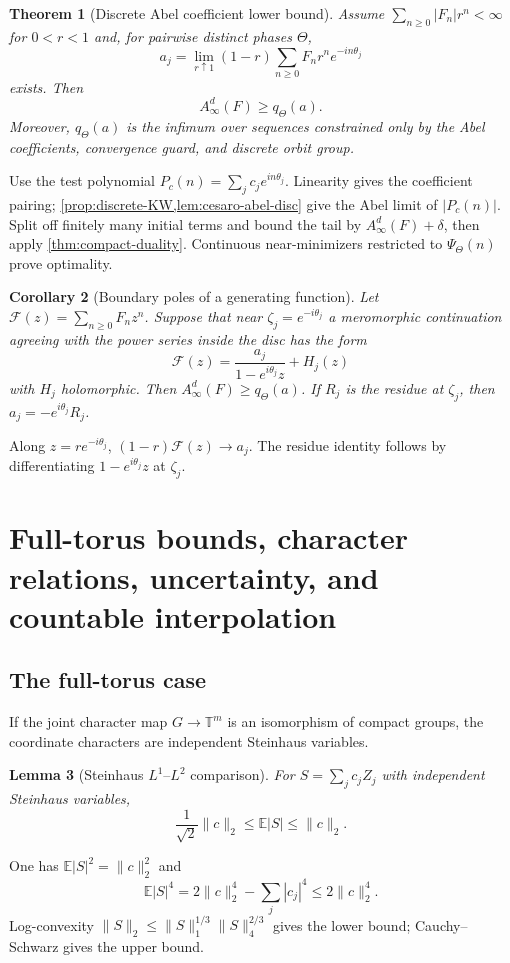 \documentclass[12pt,a4paper,twoside]{extarticle}
\makeatletter
\theoremstyle{compactplain}
\newtheorem{theorem}{Theorem}[section]
\newtheorem{lemma}[theorem]{Lemma}
\newtheorem{corollary}[theorem]{Corollary}
\theoremstyle{compactdef}
\renewenvironment{proof}[1][\proofname]{\par\pushQED{\qed}\normalfont
  \topsep2pt\trivlist\item[\hskip\labelsep\bfseries #1\@addpunct{.}]\ignorespaces}
 {\popQED\endtrivlist\@endpefalse}
\makeatother
\begin{document}
\begin{theorem}[Discrete Abel coefficient lower bound]\label{thm:discrete-abel}
Assume $\sum_{n\ge0}|F_n|r^n<\infty$ for $0<r<1$ and, for pairwise distinct phases $\Theta$,
\[
 a_j=\lim_{r\uparrow1}(1-r)\sum_{n\ge0}F_nr^ne^{-in\theta_j}
\]
exists.  Then
\[
 A_\infty^d(F)\ge q_\Theta(a).
\]
Moreover, $q_\Theta(a)$ is the infimum over sequences constrained only by the Abel coefficients, convergence guard, and discrete orbit group.
\end{theorem}
\begin{proof}
Use the test polynomial $P_c(n)=\sum_jc_je^{in\theta_j}$.  Linearity gives the coefficient pairing; \cref{prop:discrete-KW,lem:cesaro-abel-disc} give the Abel limit of $|P_c(n)|$.  Split off finitely many initial terms and bound the tail by $A_\infty^d(F)+\delta$, then apply \cref{thm:compact-duality}.  Continuous near-minimizers restricted to $\Psi_\Theta(n)$ prove optimality.
\end{proof}

\begin{corollary}[Boundary poles of a generating function]\label{cor:gf-poles}
Let $\mathcal F(z)=\sum_{n\ge0}F_nz^n$.  Suppose that near $\zeta_j=e^{-i\theta_j}$ a meromorphic continuation agreeing with the power series inside the disc has the form
\[
 \mathcal F(z)=\frac{a_j}{1-e^{i\theta_j}z}+H_j(z)
\]
with $H_j$ holomorphic.  Then $A_\infty^d(F)\ge q_\Theta(a)$.  If $R_j$ is the residue at $\zeta_j$, then $a_j=-e^{i\theta_j}R_j$.
\end{corollary}
\begin{proof}
Along $z=re^{-i\theta_j}$, $(1-r)\mathcal F(z)\to a_j$.  The residue identity follows by differentiating $1-e^{i\theta_j}z$ at $\zeta_j$.
\end{proof}

\section{Full-torus bounds, character relations, uncertainty, and countable interpolation}\label{sec:character-relations}

\subsection{The full-torus case}
If the joint character map $G\to\mathbb T^m$ is an isomorphism of compact groups, the coordinate characters are independent Steinhaus variables.
\begin{lemma}[Steinhaus $L^1$--$L^2$ comparison]
For $S=\sum_jc_jZ_j$ with independent Steinhaus variables,
\[
 \frac1{\sqrt2}\|c\|_2\le\mathbb E|S|\le\|c\|_2.
\]
\end{lemma}
\begin{proof}
One has $\mathbb E|S|^2=\|c\|_2^2$ and
\[
 \mathbb E|S|^4=2\|c\|_2^4-\sum_j|c_j|^4\le2\|c\|_2^4.
\]
Log-convexity $\|S\|_2\le\|S\|_1^{1/3}\|S\|_4^{2/3}$ gives the lower bound; Cauchy--Schwarz gives the upper bound.
\end{proof}
\end{document}
